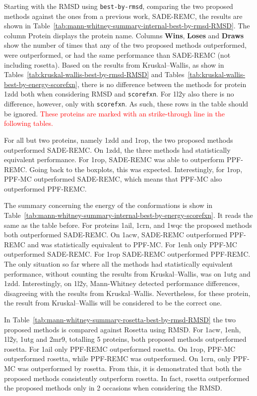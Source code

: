 Starting with the RMSD using \texttt{best-by-rmsd}, comparing the two proposed
methods against the ones from a previous work, SADE-REMC, the results are shown in
Table~\ref{tab:mann-whitney-summary-internal-best-by-rmsd-RMSD}. The column
Protein displays the protein name.
Columns \textbf{Wins}, \textbf{Loses} and \textbf{Draws} show the number of
times that any of the two proposed methods outperformed, were outperformed,
or had the same performance than SADE-REMC (not including rosetta).
Based on the results from Kruskal–Wallis, as show in
Tables~\ref{tab:kruskal-wallis-best-by-rmsd-RMSD} and
Tables~\ref{tab:kruskal-wallis-best-by-energy-scorefxn}, there is no
difference between the methods for protein 1zdd both when considering RMSD and
\texttt{scorefxn}. For 1l2y also there is no difference, however, only with
\texttt{scorefxn}. As such, these rows in the table should be ignored.
\textcolor{red}{
These proteins are marked with an strike-through line in the following tables.
}

For all but two proteins, namely 1zdd and 1rop, the two proposed methods outperformed SADE-REMC.
On 1zdd, the three methods had statistically equivalent performance. For
1rop, SADE-REMC was able to outperform PPF-REMC. Going back to the boxplots,
this was expected. Interestingly, for 1rop, PPF-MC outperformed SADE-REMC, which means
that PPF-MC also outperformed PPF-REMC.

The summary concerning the energy of the conformations is show in
Table~\ref{tab:mann-whitney-summary-internal-best-by-energy-scorefxn}. It
reads the same as the table before.
For proteins 1ail, 1crn, and 1wqc the proposed methods both outperformed
SADE-REMC. On 1acw, SADE-REMC outperformed PPF-REMC and was statistically
equivalent to PPF-MC. For 1enh only PPF-MC outperformed SADE-REMC. For 1rop
SADE-REMC outperformed PPF-REMC. The only situation so far where all the
methods had statistically equivalent performance, without counting the results
from Kruskal–Wallis, was on 1utg and 1zdd.
Interestingly, on 1l2y, Mann-Whitney detected performance differences, disagreeing with
the results from Kruskal–Wallis. Nevertheless, for these protein, the result
from Kruskal–Wallis will be considered to be the correct one.



In Table~\ref{tab:mann-whitney-summary-rosetta-best-by-rmsd-RMSD} the
two proposed methods is compared against Rosetta using RMSD. For 1acw, 1enh, 1l2y, 1utg and 2mr9, totalling 5 proteins, both
proposed methods outperformed rosetta. For 1ail only PPF-REMC
outperformed rosetta. On 1rop, PPF-MC outperformed rosetta, while
PPF-REMC was outperformed. On 1crn, only PPF-MC was outperformed
by rosetta. From this, it is demonstrated that both the proposed methods
consistently outperform rosetta. In fact, rosetta outperformed the proposed
methods only in 2 occasions when considering the RMSD.

